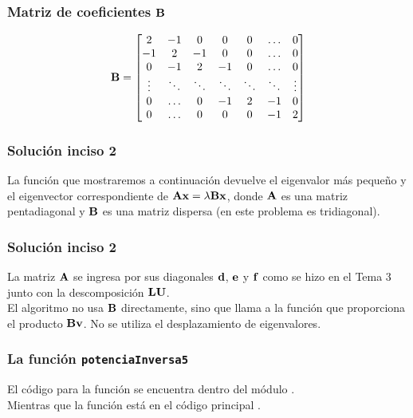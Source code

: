 \documentclass[12pt]{beamer}
\begin{document}
\begin{frame}
\frametitle{Matriz de coeficientes $\vb{B}$}
\renewcommand{\arraystretch}{1}
\begin{align*}
\vb{B} =
\begin{bmatrix}
2 & -1 & 0 & 0 & 0 & \ldots & 0 \\
-1 & 2 & -1 & 0 & 0 & \ldots & 0 \\
0 & -1 & 2 & -1 & 0 & \ldots & 0 \\
\vdots & \ddots & \ddots & \ddots & \ddots & \ddots & \vdots \\
0 & \ldots & 0 & -1 & 2 & -1 & 0 \\
0 & \ldots & 0 & 0 & 0 & -1 & 2    
\end{bmatrix}
\end{align*}
\end{frame}
\begin{frame}
\frametitle{Solución inciso 2}
La función  que mostraremos a continuación devuelve el eigenvalor más pequeño y el eigenvector correspondiente de $\vb{A x} = \lambda \vb{B x}$, \pause donde $\vb{A}$ es una matriz pentadiagonal y $\vb{B}$ es una matriz dispersa (en este problema es tridiagonal).
\end{frame}
\begin{frame}
\frametitle{Solución inciso 2}
La matriz $\vb{A}$ se ingresa por sus diagonales $\vb{d}$, $\vb{e}$ y $\vb{f}$ como se hizo en el Tema 3 junto con la descomposición $\vb{LU}$.
\\
\bigskip
\pause
El algoritmo no usa $\vb{B}$ directamente, sino que llama a la función  que proporciona el producto $\vb{B v}$. \pause No se utiliza el desplazamiento de eigenvalores.
\end{frame}
\begin{frame}
\frametitle{La función \texttt{potenciaInversa5}}
El código para la función  se encuentra dentro del módulo .
\\
\bigskip
Mientras que la función  está en el código principal .
\end{frame}
\end{document}
